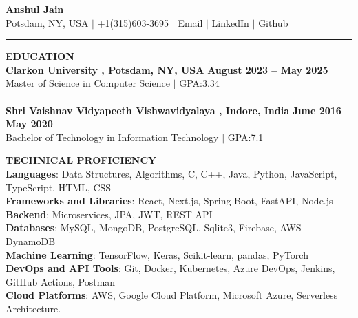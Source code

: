 \documentclass{article}
\begin{document}
\begin{center}
\thispagestyle{empty}
\large \textbf{\textbf{Anshul Jain}  \\}
\normalsize Potsdam, NY, USA $\mid$ +1(315)603-3695 $\mid$ \href{mailto:anshulj07@gmail.com}{Email} $\mid$ \href{https://www.linkedin.com/in/zanshul/}{LinkedIn} $\mid$  \href{https://github.com/anshulj07}{Github}  \\
\rule{\textwidth}{1pt}
\end{center}

\noindent \textbf{\underline{EDUCATION}} \\
\noindent \textbf{Clarkon University , Potsdam, NY, USA} \hfill \textbf{August 2023 – May 2025} \\
Master of Science in Computer Science $\mid$ GPA:3.34\\\\
\noindent \textbf{Shri Vaishnav Vidyapeeth Vishwavidyalaya , Indore, India}  \hfill \textbf{June 2016 – May 2020}  \\
Bachelor of Technology in Information Technology $\mid$ GPA:7.1

\vspace{2mm}

\noindent \textbf{\underline{TECHNICAL PROFICIENCY}} \\
\textbf{Languages}: Data Structures, Algorithms, C, C++, Java, Python, JavaScript, TypeScript, HTML, CSS\\
\textbf{Frameworks and Libraries}: React, Next.js, Spring Boot, FastAPI, Node.js\\
\textbf{Backend}: Microservices, JPA, JWT, REST API\\
\textbf{Databases}: MySQL, MongoDB, PostgreSQL, Sqlite3, Firebase, AWS DynamoDB\\
\textbf{Machine Learning}: TensorFlow, Keras, Scikit-learn, pandas, PyTorch\\
\textbf{DevOps and API Tools}: Git, Docker, Kubernetes, Azure DevOps, Jenkins, GitHub Actions, Postman\\
\textbf{Cloud Platforms}: AWS, Google Cloud Platform, Microsoft Azure, Serverless Architecture.
\vspace{2mm}


\end{document}
